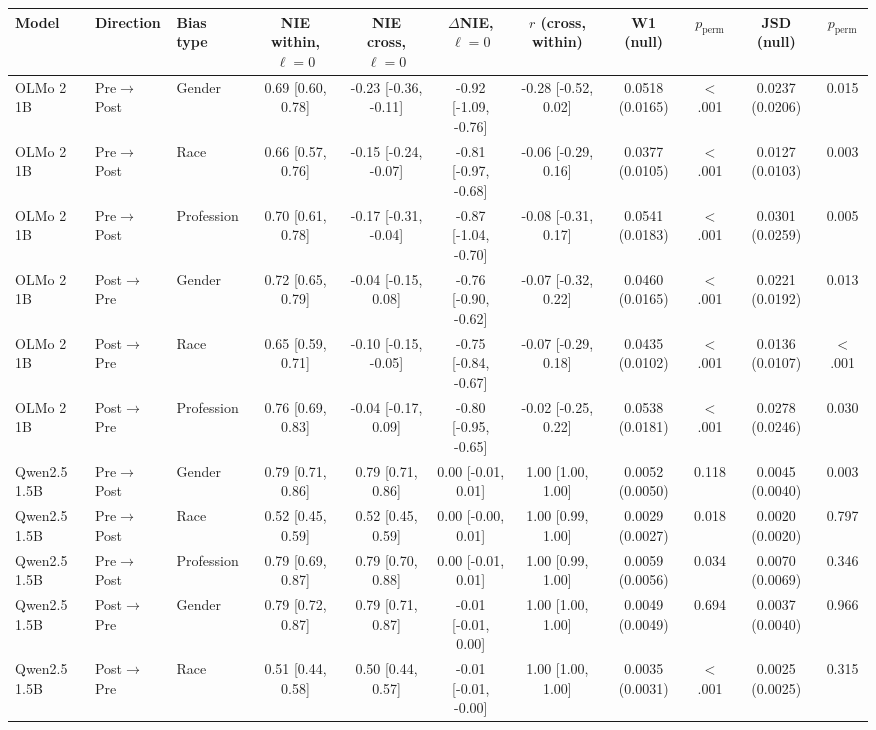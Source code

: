 \begin{tabular}{lllcccccccc}
\toprule
Model & Direction & Bias type & NIE within, $\ell=0$ & NIE cross, $\ell=0$ & $\Delta$NIE, $\ell=0$ & $r$ (cross, within) & W1 (null) & $p_\text{perm}$ & JSD (null) & $p_\text{perm}$ \\
\midrule
OLMo 2 1B & Pre$\to$Post & Gender & 0.69 [0.60, 0.78] & -0.23 [-0.36, -0.11] & -0.92 [-1.09, -0.76] & -0.28 [-0.52, 0.02] & 0.0518 (0.0165) & $<$.001 & 0.0237 (0.0206) & 0.015 \\
OLMo 2 1B & Pre$\to$Post & Race & 0.66 [0.57, 0.76] & -0.15 [-0.24, -0.07] & -0.81 [-0.97, -0.68] & -0.06 [-0.29, 0.16] & 0.0377 (0.0105) & $<$.001 & 0.0127 (0.0103) & 0.003 \\
OLMo 2 1B & Pre$\to$Post & Profession & 0.70 [0.61, 0.78] & -0.17 [-0.31, -0.04] & -0.87 [-1.04, -0.70] & -0.08 [-0.31, 0.17] & 0.0541 (0.0183) & $<$.001 & 0.0301 (0.0259) & 0.005 \\
OLMo 2 1B & Post$\to$Pre & Gender & 0.72 [0.65, 0.79] & -0.04 [-0.15, 0.08] & -0.76 [-0.90, -0.62] & -0.07 [-0.32, 0.22] & 0.0460 (0.0165) & $<$.001 & 0.0221 (0.0192) & 0.013 \\
OLMo 2 1B & Post$\to$Pre & Race & 0.65 [0.59, 0.71] & -0.10 [-0.15, -0.05] & -0.75 [-0.84, -0.67] & -0.07 [-0.29, 0.18] & 0.0435 (0.0102) & $<$.001 & 0.0136 (0.0107) & $<$.001 \\
OLMo 2 1B & Post$\to$Pre & Profession & 0.76 [0.69, 0.83] & -0.04 [-0.17, 0.09] & -0.80 [-0.95, -0.65] & -0.02 [-0.25, 0.22] & 0.0538 (0.0181) & $<$.001 & 0.0278 (0.0246) & 0.030 \\
Qwen2.5 1.5B & Pre$\to$Post & Gender & 0.79 [0.71, 0.86] & 0.79 [0.71, 0.86] & 0.00 [-0.01, 0.01] & 1.00 [1.00, 1.00] & 0.0052 (0.0050) & 0.118 & 0.0045 (0.0040) & 0.003 \\
Qwen2.5 1.5B & Pre$\to$Post & Race & 0.52 [0.45, 0.59] & 0.52 [0.45, 0.59] & 0.00 [-0.00, 0.01] & 1.00 [0.99, 1.00] & 0.0029 (0.0027) & 0.018 & 0.0020 (0.0020) & 0.797 \\
Qwen2.5 1.5B & Pre$\to$Post & Profession & 0.79 [0.69, 0.87] & 0.79 [0.70, 0.88] & 0.00 [-0.01, 0.01] & 1.00 [0.99, 1.00] & 0.0059 (0.0056) & 0.034 & 0.0070 (0.0069) & 0.346 \\
Qwen2.5 1.5B & Post$\to$Pre & Gender & 0.79 [0.72, 0.87] & 0.79 [0.71, 0.87] & -0.01 [-0.01, 0.00] & 1.00 [1.00, 1.00] & 0.0049 (0.0049) & 0.694 & 0.0037 (0.0040) & 0.966 \\
Qwen2.5 1.5B & Post$\to$Pre & Race & 0.51 [0.44, 0.58] & 0.50 [0.44, 0.57] & -0.01 [-0.01, -0.00] & 1.00 [1.00, 1.00] & 0.0035 (0.0031) & $<$.001 & 0.0025 (0.0025) & 0.315 \\

\end{tabular}
